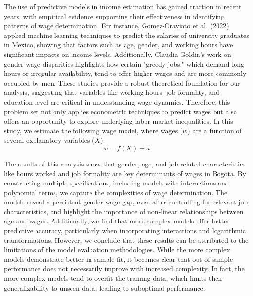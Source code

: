 \documentclass[11pt,a4paper,onecolumn]{article}
\begin{document}
    The use of predictive models in income estimation has gained traction in recent years, with empirical evidence supporting their effectiveness in identifying patterns of wage determination. For instance, Gomez-Cravioto et al. (2022) applied machine learning techniques to predict the salaries of university graduates in Mexico, showing that factors such as age, gender, and working hours have significant impacts on income levels. Additionally, Claudia Goldin’s work on gender wage disparities highlights how certain "greedy jobs," which demand long hours or irregular availability, tend to offer higher wages and are more commonly occupied by men. These studies provide a robust theoretical foundation for our analysis, suggesting that variables like working hours, job formality, and education level are critical in understanding wage dynamics. Therefore, this problem set not only applies econometric techniques to predict wages but also offers an opportunity to explore underlying labor market inequalities. In this study, we estimate the following wage model, where wages (\(w\)) are a function of several explanatory variables (\(X\)):
    \begin{equation}
    w = f(X) + u
    \end{equation}
    
    The results of this analysis show that gender, age, and job-related characteristics like hours worked and job formality are key determinants of wages in Bogota. By constructing multiple specifications, including models with interactions and polynomial terms, we capture the complexities of wage determination. The models reveal a persistent gender wage gap, even after controlling for relevant job characteristics, and highlight the importance of non-linear relationships between age and wages. Additionally, we find that more complex models offer better predictive accuracy, particularly when incorporating interactions and logarithmic transformations. However, we conclude that these results can be attributed to the limitations of the model evaluation methodologies. While the more complex models demonstrate better in-sample fit, it becomes clear that out-of-sample performance does not necessarily improve with increased complexity. In fact, the more complex models tend to overfit the training data, which limits their generalizability to unseen data, leading to suboptimal performance.
    

\end{document}
